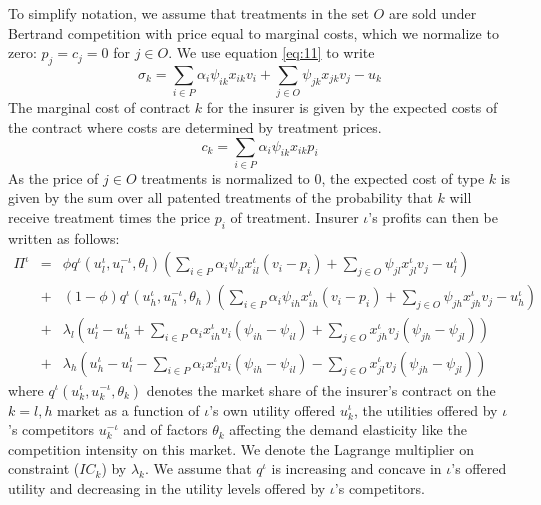 \documentclass[12pt,english,a4paper]{article}
\begin{document}
To simplify notation, we assume that treatments in the set \(O\) are sold under Bertrand competition with price equal to marginal costs, which we normalize to zero: \(p_j = c_j =0\) for \(j \in O\). We use equation \eqref{eq:11} to write
\begin{equation}
\label{eq:13}
\sigma_k = \sum_{i \in P} \alpha_i \psi_{ik} x_{ik} v_i + \sum_{j \in O} \psi_{jk} x_{jk} v_j - u_k
\end{equation}
The marginal cost of contract \(k\) for the insurer is given by the expected costs of the contract where costs are determined by treatment prices.
\begin{equation}
\label{eq:14}
c_k = \sum_{i \in P} \alpha_i \psi_{ik} x_{ik} p_i
\end{equation}
As the price of \(j \in O\) treatments is normalized to 0, the expected cost of type \(k\) is given by the sum over all patented treatments of the probability that \(k\) will receive treatment times the price \(p_i\) of treatment. Insurer \(\iota\)'s profits can then be written as follows:
\begin{eqnarray} \nonumber
\Pi^{\iota} &=& \phi q^{\iota}(u_l^{\iota},u_l^{-\iota},\theta_l) (\sum_{i \in P} \alpha_i \psi_{il} x_{il}^{\iota} (v_i-p_i) + \sum_{j \in O} \psi_{jl} x_{jl}^{\iota} v_j - u_l^{\iota}) \\ \nonumber
    &+& (1-\phi) q^{\iota}(u_h^{\iota},u_h^{-\iota},\theta_h) (\sum_{i \in P} \alpha_i \psi_{ih} x_{ih}^{\iota} (v_i-p_i) + \sum_{j \in O} \psi_{jh} x_{jh}^{\iota} v_j - u_h^{\iota}) \\
    \label{eq:15}
    &+& \lambda_l (u_l^{\iota} - u_h^{\iota} + \sum_{i \in P} \alpha_i x_{ih}^{\iota} v_i (\psi_{ih}-\psi_{il}) + \sum_{j \in O} x_{jh}^{\iota} v_j (\psi_{jh}-\psi_{jl})) \\ \nonumber
    &+& \lambda_h (u_h^{\iota} - u_l^{\iota} - \sum_{i \in P} \alpha_i x_{il}^{\iota} v_i (\psi_{ih}-\psi_{il}) - \sum_{j \in O} x_{jl}^{\iota} v_j (\psi_{jh}-\psi_{jl}))
\end{eqnarray}
where \(q^{\iota}(u_k^{\iota},u_k^{-\iota},\theta_k)\) denotes the market share of the insurer's contract on the \(k=l,h\) market as a function of \(\iota\)'s own utility offered \(u_k^{\iota}\), the utilities offered by \(\iota\)'s competitors \(u_k^{-\iota}\) and of factors \(\theta_k\) affecting the demand elasticity like the competition intensity on this market. We denote the Lagrange multiplier on constraint (\(IC_k\)) by \(\lambda_k\). We assume that \(q^{\iota}\) is increasing and concave in \(\iota\)'s offered utility and decreasing in the utility levels offered by \(\iota\)'s competitors.
\end{document}
